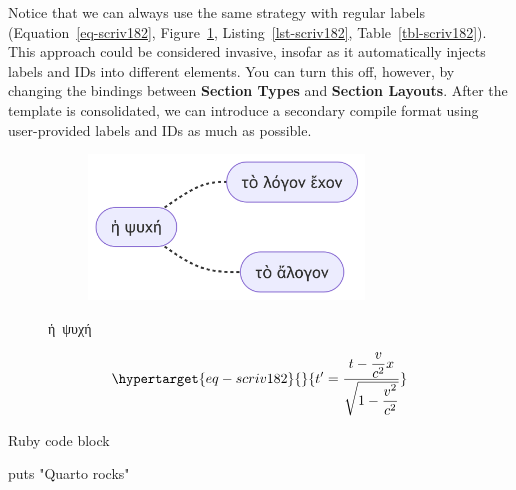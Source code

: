\documentclass[
  12pt,
  a4paper,
  numbers=noenddot,
  titlepage,
  toclink=all,
  toc=bibliography]{scrbook}
\newenvironment{Shaded}{\begin{snugshade}}{\end{snugshade}}
\newcommand{\FunctionTok}[1]{\textcolor[rgb]{0.28,0.35,0.67}{#1}}
\newcommand{\StringTok}[1]{\textcolor[rgb]{0.13,0.47,0.30}{#1}}
\theoremstyle{definition}
\theoremstyle{definition}
\theoremstyle{definition}
\theoremstyle{plain}
\theoremstyle{plain}
\theoremstyle{plain}
\theoremstyle{plain}
\theoremstyle{plain}
\theoremstyle{remark}
\begin{document}
\protect\hypertarget{scriv182}{}{}

Notice that we can always use the same strategy with regular labels
(\protect\hypertarget{cite_53}{}{\label{cite_53}Equation~\ref{eq-scriv182}},
\protect\hypertarget{cite_54}{}{\label{cite_54}Figure~\ref{fig-scriv182}},
\protect\hypertarget{cite_55}{}{\label{cite_55}Listing~\ref{lst-scriv182}},
\protect\hypertarget{cite_56}{}{\label{cite_56}Table~\ref{tbl-scriv182}}).
This approach could be considered invasive, insofar as it automatically
injects labels and IDs into different elements. You can turn this off,
however, by changing the bindings between \textbf{Section Types} and
\textbf{Section Layouts}. After the template is consolidated, we can
introduce a secondary compile format using user-provided labels and IDs
as much as possible.

\begin{figure}

{\centering 

\begin{figure}[H]

{\centering \includegraphics[width=2.89in,height=1.52in]{export_files/figure-latex/mermaid-figure-2.png}

}

\end{figure}

}

\caption{\label{fig-scriv182}ἡ~ψυχή}

\end{figure}

\begin{equation}\protect\hypertarget{eq-scriv182}{}{t' = \frac{t - \dfrac{v}{c^{2}}x}{\sqrt{1 - \dfrac{v^{2}}{c^{2}}}}}\label{eq-scriv182}\end{equation}

\begin{codelisting}

\caption{Ruby code block}

\hypertarget{lst-scriv182}{%
\label{lst-scriv182}}%
\begin{Shaded}
\begin{Highlighting}[numbers=left,,]
\FunctionTok{puts} \StringTok{"Quarto rocks"}
\end{Highlighting}
\end{Shaded}

\end{codelisting}
\end{document}
